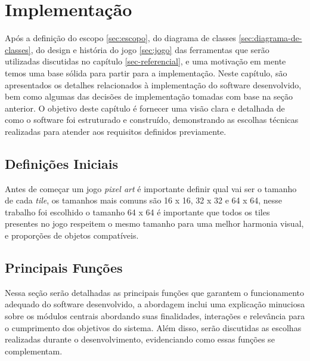 \chapter{Implementação}
\label{sec-implementacao}
Após a definição do escopo \ref{sec:escopo}, do diagrama de classes \ref{sec:diagrama-de-classes}, do design e história do jogo \ref{sec:jogo} das ferramentas que serão utilizadas discutidas no capítulo \ref{sec-referencial}, e uma motivação em mente temos uma base sólida para partir para a implementação. Neste capítulo, são apresentados os detalhes relacionados à implementação do software desenvolvido, bem como algumas das decisões de implementação tomadas com base na seção anterior. O objetivo deste capítulo é fornecer uma visão clara e detalhada de como o software foi estruturado e construído, demonstrando as escolhas técnicas realizadas para atender aos requisitos definidos previamente.

\section{Definições Iniciais}
Antes de começar um jogo \textit{pixel art} é importante definir qual vai ser o tamanho de cada \textit{tile}, os tamanhos mais comuns são 16 x 16, 32 x 32 e 64 x 64, nesse trabalho foi escolhido o tamanho 64 x 64 é importante que todos os tiles presentes no jogo respeitem o mesmo tamanho para uma melhor harmonia visual, e proporções de objetos compatíveis.

\section{Principais Funções}
Nessa seção serão detalhadas as principais funções que garantem o funcionamento adequado do software desenvolvido, a abordagem inclui uma explicação minuciosa sobre os módulos centrais abordando suas finalidades, interações e relevância para o cumprimento dos objetivos do sistema. Além disso, serão discutidas as escolhas realizadas durante o desenvolvimento, evidenciando como essas funções se complementam.

